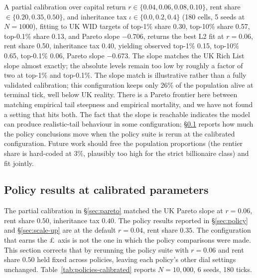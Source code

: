 \documentclass[11pt]{article}
\begin{document}
A partial calibration over capital return $r \in \{0.04, 0.06, 0.08,
0.10\}$, rent share $\in \{0.20, 0.35, 0.50\}$, and inheritance tax
$\iota \in \{0.0, 0.2, 0.4\}$ (180 cells, 5 seeds at $N=1000$),
fitting to UK \citep{saez2016wealth} WID targets of top-1\% share
0.30, top-10\% share 0.57, top-0.1\% share 0.13, and Pareto slope
$-0.706$, returns the best L2 fit at $r=0.06$, rent share 0.50,
inheritance tax 0.40, yielding observed top-1\% 0.15, top-10\% 0.65,
top-0.1\% 0.06, Pareto slope $-0.673$. The slope matches the UK
Rich List slope almost exactly; the absolute levels remain too low
by roughly a factor of two at top-1\% and top-0.1\%. The slope match
is illustrative rather than a fully validated calibration; this
configuration keeps only 26\% of the population alive at terminal
tick, well below UK reality. There is a Pareto frontier here between
matching empirical tail steepness and empirical mortality, and we
have not found a setting that hits both. The fact that the slope is
reachable indicates the model can produce realistic-tail behaviour
in some configuration; \S\ref{sec:calibrated-policies} reports how
much the policy conclusions move when the policy suite is rerun at
the calibrated configuration. Future work should free the population
proportions (the rentier share is hard-coded at 3\%, plausibly too
high for the strict billionaire class) and fit jointly.

\subsection{Policy results at calibrated parameters}
\label{sec:calibrated-policies}

The partial calibration in \S\ref{sec:pareto} matched the UK Pareto
slope at $r = 0.06$, rent share $0.50$, inheritance tax $0.40$. The
policy results reported in \S\ref{sec:policy} and \S\ref{sec:scale-up}
are at the default $r = 0.04$, rent share $0.35$. The
configuration that earns the \pounds\ axis is not the one in which
the policy comparisons were made. This section corrects that by
rerunning the policy suite with $r = 0.06$ and rent share $0.50$
held fixed across policies, leaving each policy's other dial
settings unchanged. Table~\ref{tab:policies-calibrated} reports
$N=10{,}000$, 6 seeds, 180 ticks.
\end{document}
